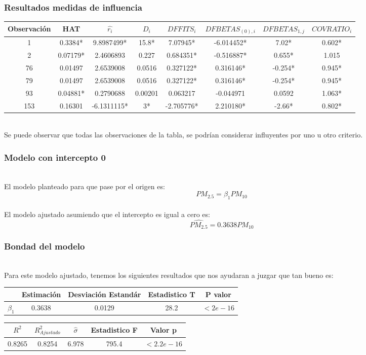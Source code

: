 \documentclass[12pt]{beamer}
\begin{document}
\begin{frame}
\frametitle{Resultados medidas de influencia}
\begin{center}
\resizebox{12.2cm}{!} {
\begin{tabular}{|cccccccc|}
\hline 
Observación & HAT & $\hat{r_{i}} $ &$D_{i}$ & $DFFITS_{i}$ & $DFBETAS_{(0),i}$ & $DFBETAS_{1,j}$ & $COVRATIO_{i}$ \\ 
\hline 
1 & 0.3384* & 9.8987499* & 15.8* & 7.07945* & -6.014452* & 7.02* & 0.602* \\ 
2 & 0.07179* & 2.4606893 & 0.227 & 0.684351* & -0.516887* & 0.655* & 1.015 \\  
76 & 0.01497 & 2.6539008 & 0.0516 & 0.327122* & 0.316146* & -0.254* & 0.945* \\  
79 & 0.01497 & 2.6539008 & 0.0516 & 0.327122* & 0.316146* & -0.254* & 0.945* \\ 
93 & 0.04881* & 0.2790688 & 0.00201 & 0.063217 & -0.044971 & 0.0592 & 1.063* \\ 
153 & 0.16301 & -6.1311115* & 3* & -2.705776* & 2.210180* & -2.66* & 0.802* \\ 
\hline 
\end{tabular} 
}
\end{center}
~\\Se puede observar que todas las observaciones de la tabla, se podrían considerar influyentes por uno u otro criterio.
\end{frame}

\begin{frame}
\frametitle{Modelo con intercepto 0}
~\\El modelo planteado para que pase por el origen es: 
$$PM_{2.5}=\beta_{1}PM_{10}$$
~\\El modelo ajustado asumiendo que el intercepto es igual a cero es: 
$$\hat{PM_{2.5}}=0.3638 PM_{10}$$
\end{frame}

\begin{frame}
\frametitle{Bondad del modelo}
~\\Para este modelo ajustado, tenemos los siguientes resultados que nos ayudaran a juzgar que tan bueno es:
\begin{center}
\begin{tabular}{|c|c|c|c|c|}
\hline 
 & Estimación & Desviación Estandár & Estadistico T & P valor \\ 
\hline 
$\beta_{1}$ & 0.3638 & 0.0129 & 28.2 & $<2e-16$ \\ 
\hline 
\end{tabular} 
\end{center}
\begin{center}
\begin{tabular}{|c|c|c|c|c|}
\hline 
$R^2$ & $R^2_{Ajustado}$ & $\hat{\sigma}$ & Estadistico F & Valor p \\ 
\hline 
0.8265 & 0.8254 & 6.978 & 795.4 & $<2.2e-16$ \\ 
\hline 
\end{tabular} 
\end{center}
\end{frame}
\end{document}
